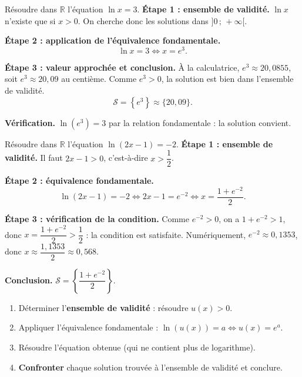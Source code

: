\documentclass[11pt]{article}
\begin{document}
\begin{exoresolu}[Résoudre $\ln x = 3$]
Résoudre dans $\mathbb{R}$ l'équation $\ln x = 3$.
\tcblower
\textbf{Étape 1 : ensemble de validité.} $\ln x$ n'existe que si $x > 0$. On cherche donc les solutions dans $]0\,;\,+\infty[$.

\textbf{Étape 2 : application de l'équivalence fondamentale.}
\[ \ln x = 3 \iff x = e^3. \]

\textbf{Étape 3 : valeur approchée et conclusion.} À la calculatrice, $e^3 \approx 20,0855$, soit $e^3 \approx 20,09$ au centième. Comme $e^3 > 0$, la solution est bien dans l'ensemble de validité.
\[ \mathcal{S} = \left\{ e^3 \right\} \approx \{20,09\}. \]

\textbf{Vérification.} $\ln(e^3) = 3$ par la relation fondamentale : la solution convient.
\end{exoresolu}

\begin{exoresolu}
Résoudre dans $\mathbb{R}$ l'équation $\ln(2x - 1) = -2$.
\tcblower
\textbf{Étape 1 : ensemble de validité.} Il faut $2x - 1 > 0$, c'est-à-dire $x > \dfrac{1}{2}$.

\textbf{Étape 2 : équivalence fondamentale.}
\[ \ln(2x-1) = -2 \iff 2x - 1 = e^{-2} \iff x = \frac{1 + e^{-2}}{2}. \]

\textbf{Étape 3 : vérification de la condition.} Comme $e^{-2} > 0$, on a $1 + e^{-2} > 1$, donc $x = \dfrac{1+e^{-2}}{2} > \dfrac{1}{2}$ : la condition est satisfaite. Numériquement, $e^{-2} \approx 0,1353$, donc $x \approx \dfrac{1,1353}{2} \approx 0,568$.

\textbf{Conclusion.} $\mathcal{S} = \left\{ \dfrac{1 + e^{-2}}{2} \right\}$.
\end{exoresolu}

\begin{methode}[Résoudre une équation de la forme $\ln(u(x)) = a$]
\begin{enumerate}
\item Déterminer l'\textbf{ensemble de validité} : résoudre $u(x) > 0$.
\item Appliquer l'équivalence fondamentale : $\ln(u(x)) = a \iff u(x) = e^a$.
\item Résoudre l'équation obtenue (qui ne contient plus de logarithme).
\item \textbf{Confronter} chaque solution trouvée à l'ensemble de validité et conclure.
\end{enumerate}
\end{methode}
\end{document}
